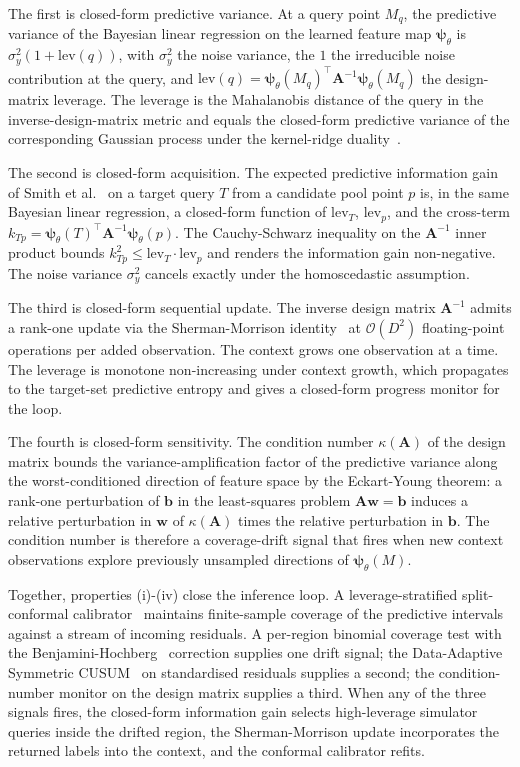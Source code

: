 \documentclass[11pt,a4paper]{article}
\newcommand{\Ainv}{\bm{A}^{-1}}
\newcommand{\psib}{\bm{\psi}}
\begin{document}
The first is closed-form predictive variance. At a query point $M_q$, the predictive variance of the Bayesian linear regression on the learned feature map $\psib_\theta$ is $\sigma_y^2 (1 + \mathrm{lev}(q))$, with $\sigma_y^2$ the noise variance, the $1$ the irreducible noise contribution at the query, and $\mathrm{lev}(q) = \psib_\theta(M_q)^\top \Ainv \psib_\theta(M_q)$ the design-matrix leverage. The leverage is the Mahalanobis distance of the query in the inverse-design-matrix metric and equals the closed-form predictive variance of the corresponding Gaussian process under the kernel-ridge duality~\cite{Rasmussen:2006gp}.

The second is closed-form acquisition. The expected predictive information gain of Smith et al.~\cite{Smith:2023epig} on a target query $T$ from a candidate pool point $p$ is, in the same Bayesian linear regression, a closed-form function of $\mathrm{lev}_T$, $\mathrm{lev}_p$, and the cross-term $k_{Tp} = \psib_\theta(T)^\top \Ainv \psib_\theta(p)$. The Cauchy-Schwarz inequality on the $\Ainv$ inner product bounds $k_{Tp}^2 \leq \mathrm{lev}_T \cdot \mathrm{lev}_p$ and renders the information gain non-negative. The noise variance $\sigma_y^2$ cancels exactly under the homoscedastic assumption.

The third is closed-form sequential update. The inverse design matrix $\Ainv$ admits a rank-one update via the Sherman-Morrison identity~\cite{Sherman:1950} at $\mathcal{O}(D^2)$ floating-point operations per added observation. The context grows one observation at a time. The leverage is monotone non-increasing under context growth, which propagates to the target-set predictive entropy and gives a closed-form progress monitor for the loop.

The fourth is closed-form sensitivity. The condition number $\kappa(\bm{A})$ of the design matrix bounds the variance-amplification factor of the predictive variance along the worst-conditioned direction of feature space by the Eckart-Young theorem: a rank-one perturbation of $\bm{b}$ in the least-squares problem $\bm{Aw} = \bm{b}$ induces a relative perturbation in $\bm{w}$ of $\kappa(\bm{A})$ times the relative perturbation in $\bm{b}$. The condition number is therefore a coverage-drift signal that fires when new context observations explore previously unsampled directions of $\psib_\theta(M)$.

Together, properties (i)-(iv) close the inference loop. A leverage-stratified split-conformal calibrator~\cite{Lei:2018conformal,Vovk:2005alg,Araz:2025conformal} maintains finite-sample coverage of the predictive intervals against a stream of incoming residuals. A per-region binomial coverage test with the Benjamini-Hochberg~\cite{Benjamini:1995fdr} correction supplies one drift signal; the Data-Adaptive Symmetric CUSUM~\cite{Ahad:2022dascusum} on standardised residuals supplies a second; the condition-number monitor on the design matrix supplies a third. When any of the three signals fires, the closed-form information gain selects high-leverage simulator queries inside the drifted region, the Sherman-Morrison update incorporates the returned labels into the context, and the conformal calibrator refits.
\end{document}
